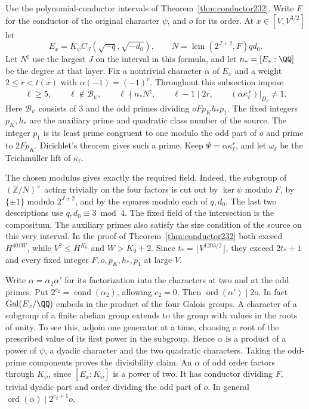\documentclass[a4paper,11pt]{article}
\theoremstyle{definition}
\theoremstyle{remark}
\newcommand{\ZZ}{\mathbb Z}\newcommand{\ord}{\operatorname{ord}}
\numberwithin{equation}{section}
\begin{document}
Use the polynomial-conductor intervals of Theorem~\ref{thm:conductor232}.
Write \(F\) for the conductor of the original character \(\psi\),
and \(o\) for its order. At \(x\in[V,V^{3/2}]\) let
\[
 E_x=K_\psi C_J(\sqrt{-q},\sqrt{-d_0}),\qquad
 N=\operatorname{lcm}(2^{J+2},F)q d_0 .
\]
Let \(N^\natural\) use the largest \(J\) on the interval in this
formula, and let \(n_*=[E_*:\QQ]\) be the degree at that layer.
Fix a nontrivial character \(\alpha\) of \(E_x\) and a weight
\(2\le r<t(x)\) with \(\alpha(-1)=(-1)^r\). Throughout this
subsection impose
\[
 \ell\ge5,\qquad \ell\notin\mathcal B_\psi,\qquad
 \ell\nmid n_*N^\natural,\qquad \ell-1\mid 2r,\qquad
 (\bar\alpha\bar\kappa_\ell^{\,r})|_{D_\ell}\ne1 .
\]
Here \(\mathcal B_\psi\) consists of \(3\) and the odd primes
dividing \(oFp_K h_*p_1\). The fixed integers \(p_K,h_*\) are
the auxiliary prime and quadratic class number of the source.
The integer \(p_1\) is its least prime congruent to one modulo
the odd part of \(o\) and prime to \(2Fp_K\). Dirichlet's
theorem gives such a prime. Keep
\(\Psi=\alpha\kappa_\ell^r\), and let \(\omega_\ell\) be the
Teichm\"uller lift of \(\bar\kappa_\ell\).

The chosen modulus gives exactly the required field. Indeed,
the subgroup of \((\ZZ/N)^\times\) acting trivially on the
four factors is cut out by \(\ker\psi\) modulo \(F\), by
\(\{\pm1\}\) modulo \(2^{J+2}\), and by the squares modulo
each of \(q,d_0\). The last two descriptions use
\(q,d_0\equiv3\bmod4\). The fixed field of the intersection
is the compositum. The auxiliary primes also satisfy the size
condition of the source on this very interval. In the proof of
Theorem~\ref{thm:conductor232} both exceed \(H^{401W}\), while
\(V^2\le H^{K_0}\) and \(W>K_0+2\). Since
\(t_*=\lfloor V^{1203/2}\rfloor\), they exceed \(2t_*+1\)
and every fixed integer \(F,o,p_K,h_*,p_1\) at large \(V\).

Write \(\alpha=\alpha_2\alpha'\) for its factorization into
the characters at two and at the odd primes. Put
\(2^{c_2}=\operatorname{cond}(\alpha_2)\), allowing \(c_2=0\).
Then \(\operatorname{ord}(\alpha')\mid 2o\).
In fact \(\operatorname{Gal}(E_x/\QQ)\) embeds in the product
of the four Galois groups. A character of a subgroup of a
finite abelian group extends to the group with values in the
roots of unity. To see this, adjoin one generator at a time,
choosing a root of the prescribed value of its first power in
the subgroup. Hence \(\alpha\) is a product of a power of
\(\psi\), a dyadic character and the two quadratic characters.
Taking the odd-prime components proves the divisibility claim.
An \(\alpha\) of odd order factors through \(K_\psi\), since
\([E_x:K_\psi]\) is a power of two. It has conductor dividing
\(F\), trivial dyadic part and order dividing the odd part of
\(o\). In general \(\operatorname{ord}(\alpha)\mid 2^{c_2+1}o\).
\end{document}
